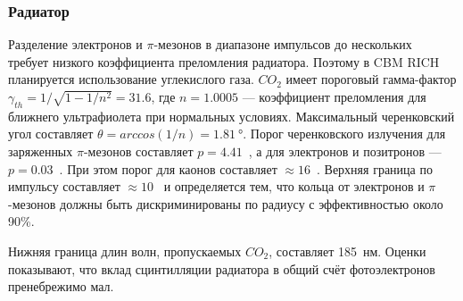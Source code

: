 %                                         

\subsubsection{Радиатор}\label{sec:CbmRichRadiator}


Разделение электронов и $\pi$-мезонов в диапазоне импульсов до нескольких~\GeVoverC{} требует низкого коэффициента преломления радиатора. Поэтому в CBM RICH планируется использование углекислого газа.
$CO_{2}$ имеет пороговый гамма-фактор $\gamma _{th} = 1 / \sqrt{1 - 1/n^{2}} = 31.6$, где $n = 1.0005$ --- коэффициент преломления для ближнего ультрафиолета при нормальных условиях. Максимальный черенковский угол составляет $\theta = arccos(1/n) = \SI{1.81}{\degree}$. Порог черенковского излучения для заряженных $\pi$-мезонов составляет $p = 4.41$~\GeVoverC{}, а для электронов и позитронов --- $p = 0.03$~\GeVoverC{}. При этом порог для каонов составляет $\approx 16$~\GeVoverC{}. Верхняя граница по импульсу составляет $\approx 10$~\GeVoverC{} и определяется тем, что кольца от электронов и $\pi$-мезонов должны быть дискриминированы по радиусу с эффективностью около 90\%.

Нижняя граница длин волн, пропускаемых $CO_{2}$, составляет 185~нм. Оценки показывают, что вклад сцинтилляции радиатора в общий счёт фотоэлектронов пренебрежимо мал.



